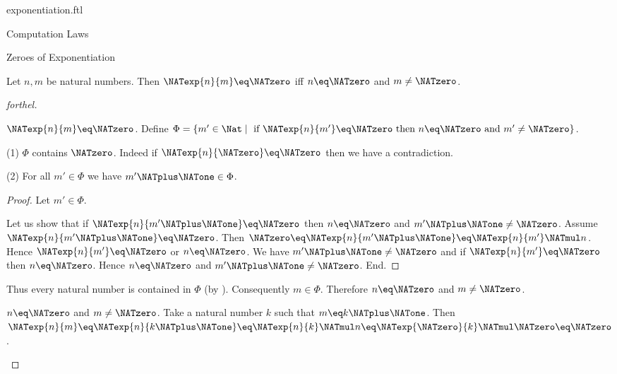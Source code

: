 \documentclass{naproche-library}
\begin{document}
\begin{smodule}[title=Exponentiation]{exponentiation.ftl}
\begin{sfragment}{Computation Laws}
  \begin{sfragment}{Zeroes of Exponentiation}
    \begin{proposition}[forthel,id=ARITHMETIC_09_3860221447372800]
      Let $n, m$ be natural numbers.
      Then $\NATexp{n}{m} \eq \NATzero$ iff $n \eq \NATzero$ and $m \neq \NATzero$.
    \end{proposition}
    \begin{proof}[forthel]
      \begin{case}{$\NATexp{n}{m} \eq \NATzero$.}
        Define $\Phi = \{ m' \in \Nat \mid\text{ if }\NATexp{n}{m'} \eq \NATzero\text{ then }n \eq \NATzero\text{ and }m' \neq \NATzero \}$.

        (1) $\Phi$ contains $\NATzero$.
        Indeed if $\NATexp{n}{\NATzero} \eq \NATzero$ then we have a contradiction.

        (2) For all $m' \in \Phi$ we have $m' \NATplus \NATone \in \Phi$.
        \begin{proof}
          Let $m' \in \Phi$.

          Let us show that if $\NATexp{n}{m' \NATplus \NATone} \eq \NATzero$ then $n \eq \NATzero$ and $m' \NATplus \NATone \neq \NATzero$.
            Assume $\NATexp{n}{m' \NATplus \NATone} \eq \NATzero$.
            Then $\NATzero \eq \NATexp{n}{m' \NATplus \NATone} \eq \NATexp{n}{m'} \NATmul n$.
            Hence $\NATexp{n}{m'} \eq \NATzero$ or $n \eq \NATzero$.
            We have $m' \NATplus \NATone \neq \NATzero$ and if $\NATexp{n}{m'} \eq \NATzero$ then $n \eq \NATzero$.
            Hence $n \eq \NATzero$ and $m' \NATplus \NATone \neq \NATzero$.
          End.
        \end{proof}

        Thus every natural number is contained in $\Phi$ (by ).
        Consequently $m \in \Phi$.
        Therefore $n \eq \NATzero$ and $m \neq \NATzero$.
      \end{case}

      \begin{case}{$n \eq \NATzero$ and $m \neq \NATzero$.}
        Take a natural number $k$ such that $m \eq k \NATplus \NATone$.
        Then $\NATexp{n}{m}
          \eq \NATexp{n}{k \NATplus \NATone}
          \eq \NATexp{n}{k} \NATmul n
          \eq \NATexp{\NATzero}{k} \NATmul \NATzero
          \eq \NATzero$.
      \end{case}
    \end{proof}
  \end{sfragment}
\end{sfragment}
\end{smodule}
\end{document}
